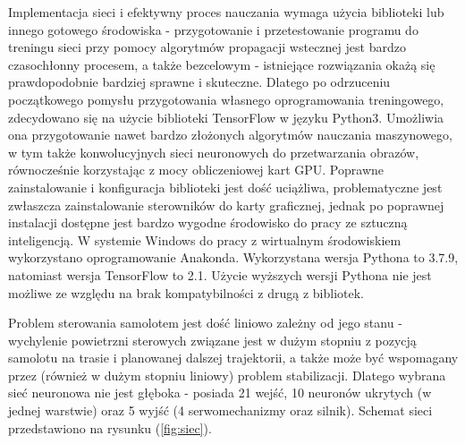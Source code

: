 \documentclass[12pt, a4paper]{article}
\let\oldref\ref
\renewcommand{\ref}[1]{(\oldref{#1})}
\begin{document}
Implementacja sieci i efektywny proces nauczania wymaga użycia biblioteki lub innego gotowego środowiska - przygotowanie i przetestowanie programu do treningu sieci przy pomocy algorytmów propagacji wstecznej jest bardzo czasochłonny procesem, a także bezcelowym - istniejące rozwiązania okażą się prawdopodobnie bardziej sprawne i skuteczne. Dlatego po odrzuceniu początkowego pomysłu przygotowania własnego oprogramowania treningowego, zdecydowano się na użycie biblioteki TensorFlow w języku Python3. Umożliwia ona przygotowanie nawet bardzo złożonych algorytmów nauczania maszynowego, w tym także konwolucyjnych sieci neuronowych do przetwarzania obrazów, równocześnie korzystając z mocy obliczeniowej kart GPU. Poprawne zainstalowanie i konfiguracja biblioteki jest dość uciążliwa, problematyczne jest zwłaszcza zainstalowanie sterowników do karty graficznej, jednak po poprawnej instalacji dostępne jest bardzo wygodne środowisko do pracy ze sztuczną inteligencją. W systemie Windows do pracy z wirtualnym środowiskiem wykorzystano oprogramowanie Anakonda. Wykorzystana wersja Pythona to 3.7.9, natomiast wersja TensorFlow to 2.1. Użycie wyższych wersji Pythona nie jest możliwe ze względu na brak kompatybilności z drugą z bibliotek.

Problem sterowania samolotem jest dość liniowo zależny od jego stanu - wychylenie powietrzni sterowych związane jest w dużym stopniu z pozycją samolotu na trasie i planowanej dalszej trajektorii, a także może być wspomagany przez (również w dużym stopniu liniowy) problem stabilizacji. Dlatego wybrana sieć neuronowa nie jest głęboka - posiada 21 wejść, 10 neuronów ukrytych (w jednej warstwie) oraz 5 wyjść (4 serwomechanizmy oraz silnik). Schemat sieci przedstawiono na rysunku \ref{fig:siec}.
\end{document}
